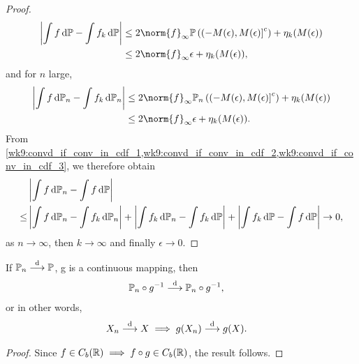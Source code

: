 \documentclass[12pt]{article}
\begin{document}
\begin{proof}
\begin{align}
\left| \int f \ud\P - \int f_k \ud\P\right|
&\leq 2\norm{f}_{\infty} \P \left({\left(-M(\epsilon), M(\epsilon)\right]^c}\right) + \eta_k(M(\epsilon))\nn
&\leq 2\norm{f}_{\infty} \epsilon + \eta_k(M(\epsilon)), \label{wk9:convd_if_conv_in_cdf_2}
\end{align}
and for $n$ large,
\begin{align}
\left| \int f \ud\P_n - \int f_k \ud\P_n\right|
&\leq 2\norm{f}_{\infty} \P_n \left({\left(-M(\epsilon), M(\epsilon)\right]^c}\right) + \eta_k(M(\epsilon))\nn
&\leq 2 \norm{f}_{\infty} \epsilon + \eta_k(M(\epsilon)). \label{wk9:convd_if_conv_in_cdf_3}
\end{align}
From \cref{wk9:convd_if_conv_in_cdf_1,wk9:convd_if_conv_in_cdf_2,wk9:convd_if_conv_in_cdf_3}, we therefore obtain
\begin{align*}
     & \left| \int f \ud\P_n - \int f \ud\P \right| \\
\leq & \left| \int f \ud\P_n - \int f_k \ud\P_n \right| +
\left| \int f_k \ud\P_n - \int f_k \ud\P \right| +
\left| \int f_k \ud\P - \int f \ud\P \right| \to 0,
\end{align*}
as $n\to\infty$, then $k\to\infty$ and finally $\epsilon\to0$.
\end{proof}
%
\begin{Lemma}
If $\P_n \convd \P$, g is a continuous mapping, then
\begin{align*}
& \P_n \circ g^{-1} \convd \P_n \circ g^{-1}, 
\end{align*}
or in other words,
\begin{align*}
& X_n \stackrel{\mathrm{d}}{\longrightarrow} X \implies g(X_n) \stackrel{\mathrm{d}}{\longrightarrow} g(X).
\end{align*}
\end{Lemma}
\begin{proof}
Since $f \in C_b(\mathbb{R}) \implies f \circ g \in C_b(\mathbb{R})$, the result follows.
\end{proof}
\end{document}
